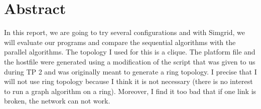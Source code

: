 \documentclass[
10pt, %
a4paper, %
oneside, %
headinclude,footinclude, %
BCOR5mm, %
]{scrartcl}
\title{\normalfont\spacedallcaps{Results of the experiments}} %
\author{\spacedlowsmallcaps{Vincent Rébiscoul}} %
\date{} %
\begin{document}

\renewcommand{\sectionmark}[1]{\markright{\spacedlowsmallcaps{#1}}} %
\lehead{\mbox{\llap{\small\thepage\kern1em\color{halfgray} \vline}\color{halfgray}\hspace{0.5em}\rightmark\hfil}} %
\newcommand{\bigo}{\mathcal{O}}
\pagestyle{scrheadings} %


\maketitle %

\setcounter{tocdepth}{2} %

\tableofcontents %

\listoffigures %

\listoftables %


\section*{Abstract} %

In this report, we are going to try several configurations and with
Simgrid, we will evaluate our programs and compare the sequential
algorithms with the parallel algorithms. The topology I used for this
is a clique. The platform file and the hostfile were generated using a
modification of the script that was given to us during TP 2 and was
originally meant to generate a ring topology. I precise that I will
not use ring topology because I think it is not necessary (there is no
interest to run a graph algorithm on a ring). Moreover, I find it too
bad that if one link is broken, the network can not work.
\end{document}

